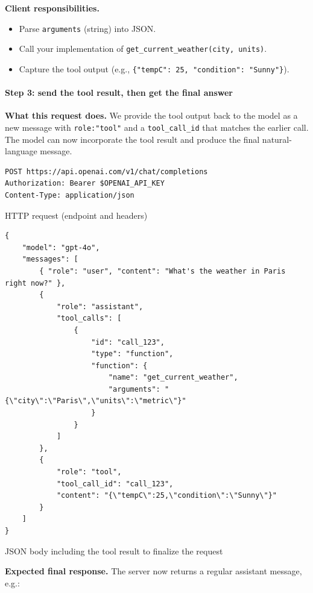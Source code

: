 \documentclass[english]{article}
\begin{document}
\noindent\textbf{Client responsibilities.}
\begin{itemize}
  \item Parse \texttt{arguments} (string) into JSON.
  \item Call your implementation of \texttt{get\_current\_weather(city, units)}.
  \item Capture the tool output (e.g., \texttt{\{"tempC": 25, "condition": "Sunny"\}}).
\end{itemize}

\paragraph{Step 3: send the tool result, then get the final answer}

\noindent\textbf{What this request does.}
We provide the tool output back to the model as a new message with \texttt{role:"tool"} and a \texttt{tool\_call\_id} that matches the earlier call. The model can now incorporate the tool result and produce the final natural-language message.

\begin{listing}[H]
\begin{verbatim}
POST https://api.openai.com/v1/chat/completions
Authorization: Bearer $OPENAI_API_KEY
Content-Type: application/json
\end{verbatim}
\caption{HTTP request (endpoint and headers)}
\end{listing}

\begin{listing}[H]
\begin{verbatim}
{
    "model": "gpt-4o",
    "messages": [
        { "role": "user", "content": "What's the weather in Paris right now?" },
        {
            "role": "assistant",
            "tool_calls": [
                {
                    "id": "call_123",
                    "type": "function",
                    "function": {
                        "name": "get_current_weather",
                        "arguments": "{\"city\":\"Paris\",\"units\":\"metric\"}"
                    }
                }
            ]
        },
        {
            "role": "tool",
            "tool_call_id": "call_123",
            "content": "{\"tempC\":25,\"condition\":\"Sunny\"}"
        }
    ]
}
\end{verbatim}
\caption{JSON body including the tool result to finalize the request}
\end{listing}

\noindent\textbf{Expected final response.}
The server now returns a regular assistant message, e.g.:
\end{document}
